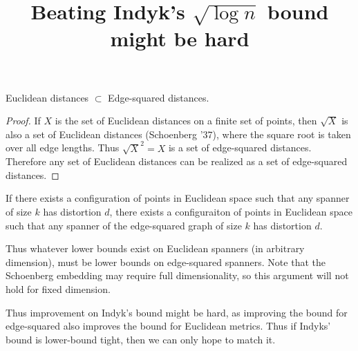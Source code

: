 \title{Beating Indyk's $\sqrt{\log n}$ bound might be hard}


\begin{theorem} 
Euclidean distances $\subset$ Edge-squared distances.
\end{theorem}

\begin{proof}
If $X$ is the set of Euclidean distances on a finite set of points, then $\sqrt{X}$ is also a set of Euclidean distances (Schoenberg '37), where the square root is taken over all edge lengths.  Thus $\sqrt{X}^2 = X$ is a set of edge-squared distances. Therefore any set of Euclidean distances can be realized as a set of edge-squared distances.
\end{proof}

\begin{corollary} If there exists a configuration of points in Euclidean space such that any spanner of size $k$ has distortion $d$, there exists a configuraiton of points in Euclidean space such that any spanner of the edge-squared graph of size $k$ has distortion $d$.
\end{corollary}

Thus whatever lower bounds exist on Euclidean spanners (in arbitrary dimension), must be lower bounds on edge-squared spanners. Note that the Schoenberg embedding may require full dimensionality, so this argument will not hold for fixed dimension.

Thus improvement on Indyk's bound might be hard, as improving the bound for edge-squared also improves the bound for Euclidean metrics. Thus if Indyks' bound is lower-bound tight, then we can only hope to match it.


